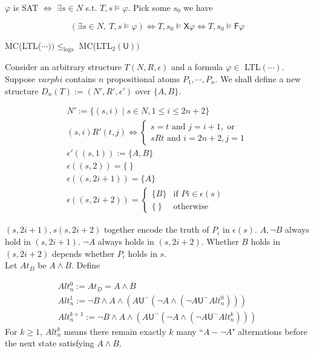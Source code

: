 \documentclass[12pt]{article}
\begin{document}
\begin{CJK*}{GBK}{song}
$\varphi$ is SAT  $\Longleftrightarrow$ $\exists s\in N$ s.t. $T,s\models \varphi$. Pick some $s_0$ we have

$$(\exists s\in N,\ T,s\models \varphi) \Longleftrightarrow T,s_0\models \textsf{X}\varphi\Longleftrightarrow T,s_0\models\textsf{F}\varphi$$


MC(LTL($\cdots))\leq_{\text{logs}}$ MC(LTL$_2(\textsf{U}))$

Consider an arbitrary structure $T(N,R,\epsilon)$ and a formula $\varphi\in$ LTL$(\cdots)$. Suppose $varphi$ contains $n$ propositional atoms $P_1,\cdots, P_n$.
We shall define a new structure $D_n(T):=(N',R',\epsilon')$ over $\{A,B\}$.

$$\begin{array}{l}
N':=\{(s,i)\mid s\in N, 1\leq i\leq 2n+2\}\\

(s,i)R'(t,j) \Longleftrightarrow\left\{\begin{array}{l}
s=t \mbox{ and } j=i+1, \mbox{ or }\\
sRt \mbox{ and } i=2n+2, j=1
\end{array}\right.\\
\epsilon'((s,1)):=\{A,B\}\\
\epsilon((s,2))=\{\ \}\\
\epsilon((s,2i+1))=\{A\}\\
\epsilon((s,2i+2))=\left\{\begin{array}{ll}
\{B\} & \mbox{if } Pi\in \epsilon(s)\\
\{\ \} & \mbox{otherwise}
\end{array}\right.
\end{array}
$$

$(s,2i+1), s(s,2i+2)$ together encode the truth of $P_i$ in $\epsilon(s)$.
%
$A, \neg B$ always hold in $(s,2i+1)$. $\neg A$ always holds in $(s,2i+2)$. Whether $B$ holds in $(s,2i+2)$ depends whether $P_i$ holds in $s$. \\


Let $At_D$ be $A\wedge B$. Define

$$\begin{array}{l}
Alt^0_n:=At_D=A\wedge B\\
Alt^1_n:=\neg B\wedge A\wedge\left(A\textsf{U}^-\left(\neg A\wedge\left(\neg A\textsf{U}^-Alt_n^0\right)\right)\right)\\
Alt^{k+1}_n:=\neg B\wedge A\wedge\left(A\textsf{U}^-\left(\neg A\wedge\left(\neg A\textsf{U}^-Alt_n^k\right)\right)\right)
\end{array}$$
%
For $k\geq 1$, $Alt^k_n$ means there remain exactly $k$ many ``$A-\neg A$" alternations before the next state satisfying $A\wedge B$.\\


\end{CJK*}
\end{document}
